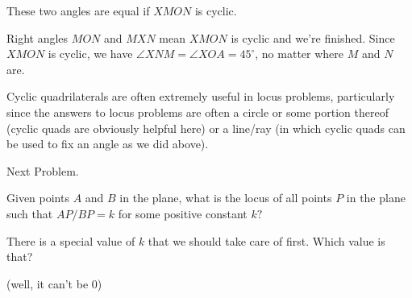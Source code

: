 
These two angles are equal if $XMON$ is cyclic.



Right angles $MON$ and $MXN$ mean $XMON$ is cyclic and we're finished. Since $XMON$ is cyclic, we have $\angle XNM = \angle XOA = 45^\circ$, no matter where $M$ and $N$ are.

\begin{note}
    Cyclic quadrilaterals are often extremely useful in locus problems, particularly since the answers to locus problems are often a circle or some portion thereof (cyclic quads are obviously helpful here) or a line/ray (in which cyclic quads can be used to fix an angle as we did above).    
\end{note}

Next Problem.

\begin{example}
    Given points $A$ and $B$ in the plane, what is the locus of all points $P$ in the plane such that $AP/BP = k$ for some positive constant $k?$    
\end{example}

There is a special value of $k$ that we should take care of first. Which value is that?

(well, it can't be 0)






